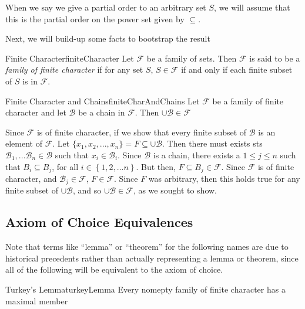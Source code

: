 \documentclass[oneside]{book}
\newcommand{\sse}{\subseteq}
\begin{document}
When we say we give a partial order to an arbitrary set $S$, we will assume that this is the partial order on the power
set given by $\sse$.

Next, we will build-up some facts to bootstrap the result

\begin{defn}{Finite Character}{finiteCharacter}
	Let $\mathcal{F}$ be a family of sets. Then $\mathcal{F}$ is said to be a \emph{family of finite character} if for
	any set $S$, $S \in \mathcal{F}$ if and only if each finite subset of $S$ is in $\mathcal{F}$.
\end{defn}

\begin{lem}{Finite Character and Chains}{finiteCharAndChains}
	Let $\mathcal{F}$ be a family of finite character and let $\mathcal{B}$ be a chain in $\mathcal{F}$. Then $\cup
	\mathcal{B} \in \mathcal{F}$
\end{lem}

\begin{Proof}
	Since $\mathcal{F}$ is of finite character, if we show that every finite subset of $\mathcal{B}$ is an element of
	$\mathcal{F}$. Let $\{ x_1, x_2, ..., x_n\}  = F \sse \cup \mathcal{B}$. Then there must exists sts
	$ \mathcal{B}_1, ... \mathcal{B}_n \in \mathcal{B}$ such that $x_i \in \mathcal{B}_i$. Since $\mathcal{B}$ is
	a chain, there exists a $1 \le j \le n$ such that $B_i \sse B_j$, for all $i \in \left\{ 1,2,...n \right\}$. But
	then, $F \sse B_{j} \in \mathcal{F}$. Since $\mathcal{F}$ is of finite character, and $\mathcal B_j \in
	\mathcal{F}$, $F \in \mathcal{F}$. Since $F$ was arbitrary, then this holds true for any finite subset of
	$\cup\mathcal{B}$, and so $\cup\mathcal{B} \in \mathcal{F}$, as we sought to show.
\end{Proof}

\subsection{Axiom of Choice Equivalences}

Note that terms like ``lemma'' or ``theorem'' for the following names are due to historical precedents rather than actually
representing a lemma or theorem, since all of the following will be equivalent to the axiom of choice.

\begin{thm}{Turkey's Lemma}{turkeyLemma}
	Every nomepty family of finite character has a maximal member
\end{thm}
\end{document}
